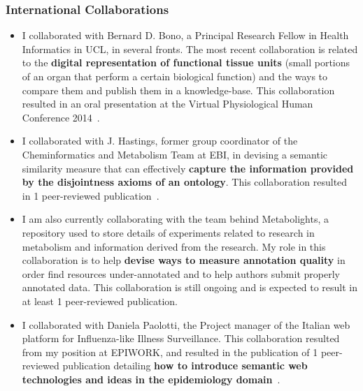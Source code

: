\subsubsection{International Collaborations}

\begin{itemize}
    \item I collaborated with Bernard D. Bono, a Principal Research Fellow in Health Informatics in UCL, in several fronts. The most recent collaboration is related to the \textbf{digital representation of functional tissue units} (small portions of an organ that perform a certain biological function) and the ways to compare them and publish them in a knowledge-base. This collaboration resulted in an oral presentation at the Virtual Physiological Human Conference 2014~\autocite{Ferreira2014}.
\end{itemize}

\begin{itemize}
    \item I collaborated with J. Hastings, former group coordinator of the Cheminformatics and Metabolism Team at EBI, in devising a semantic similarity measure that can effectively \textbf{capture the information provided by the disjointness axioms of an ontology}. This collaboration resulted in 1 peer-reviewed publication~\autocite{Ferreira2013}.
    \item I am also currently collaborating with the team behind Metabolights, a repository used to store details of experiments related to research in metabolism and information derived from the research. My role in this collaboration is to help \textbf{devise ways to measure annotation quality} in order find resources under-annotated and to help authors submit properly annotated data. This collaboration is still ongoing and is expected to result in at least 1 peer-reviewed publication.
\end{itemize}

\begin{itemize}
    \item I collaborated with Daniela Paolotti, the Project manager of the Italian web platform for Influenza-like Illness Surveillance. This collaboration resulted from my position at EPIWORK, and resulted in the publication of 1 peer-reviewed publication detailing \textbf{how to introduce semantic web technologies and ideas in the epidemiology domain}~\autocite{Ferreira2012a}.
\end{itemize}


